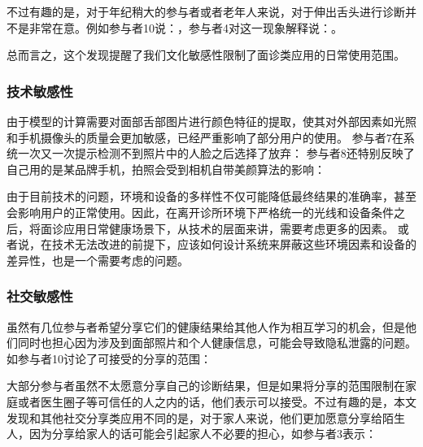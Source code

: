 不过有趣的是，对于年纪稍大的参与者或者老年人来说，对于伸出舌头进行诊断并不是非常在意。例如参与者10说：，参与者4对这一现象解释说：。 

总而言之，这个发现提醒了我们文化敏感性限制了面诊类应用的日常使用范围。


\subsubsection{技术敏感性}


由于模型的计算需要对面部舌部图片进行颜色特征的提取，使其对外部因素如光照和手机摄像头的质量会更加敏感，已经严重影响了部分用户的使用。
参与者7在系统一次又一次提示检测不到照片中的人脸之后选择了放弃：
参与者8还特别反映了自己用的是某品牌手机，拍照会受到相机自带美颜算法的影响：

由于目前技术的问题，环境和设备的多样性不仅可能降低最终结果的准确率，甚至会影响用户的正常使用。因此，在离开诊所环境下严格统一的光线和设备条件之后，将面诊应用日常健康场景下，从技术的层面来讲，需要考虑更多的因素。
或者说，在技术无法改进的前提下，应该如何设计系统来屏蔽这些环境因素和设备的差异性，也是一个需要考虑的问题。

\subsubsection{社交敏感性}


虽然有几位参与者希望分享它们的健康结果给其他人作为相互学习的机会，但是他们同时也担心因为涉及到面部照片和个人健康信息，可能会导致隐私泄露的问题。
如参与者10讨论了可接受的分享的范围：

大部分参与者虽然不太愿意分享自己的诊断结果，但是如果将分享的范围限制在家庭或者医生圈子等可信任的人之内的话，他们表示可以接受。不过有趣的是，本文发现和其他社交分享类应用不同的是，对于家人来说，他们更加愿意分享给陌生人，因为分享给家人的话可能会引起家人不必要的担心，如参与者3表示：


